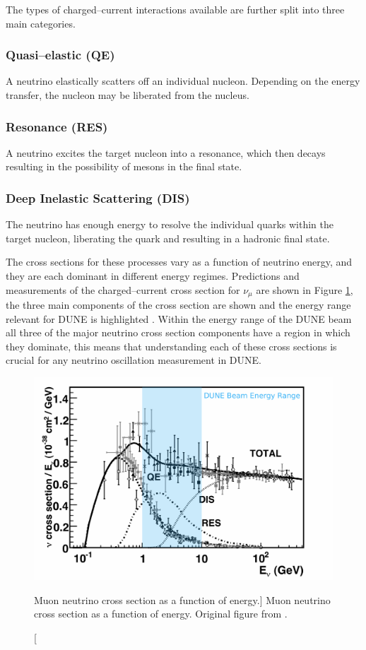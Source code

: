 The types of charged--current interactions available are further split into 
three main categories.

\subsubsection*{Quasi--elastic (QE)}
A neutrino elastically scatters off an individual nucleon. Depending on the
energy transfer, the nucleon may be liberated from the nucleus.
\subsubsection*{Resonance (RES)}
A neutrino excites the target nucleon into a resonance, which then decays
resulting in the possibility of mesons in the final state.
\subsubsection*{Deep Inelastic Scattering (DIS)}
The neutrino has enough energy to resolve the individual quarks within the
target nucleon, liberating the quark and resulting in a hadronic final state.

\bigskip

The cross sections for these processes vary as a function of neutrino energy,
and they are each dominant in different energy regimes. Predictions and 
measurements of the charged--current cross section for $\nu_\mu$ are shown in 
Figure \ref{fig:numu_xsec}, the three main components of the cross section are 
shown and the energy range relevant for DUNE is highlighted 
\cite{Formaggio:2013kya}. Within the energy range of the DUNE beam all three of 
the major neutrino cross section components have a region in which they 
dominate, this means that understanding each of these cross sections is crucial 
for any neutrino oscillation measurement in DUNE. 

\begin{figure}
	\centering
	\includegraphics[width=\textwidth]{figures/numu_xsec.pdf}
	\caption
	[Muon neutrino cross section as a function of energy.]
	{Muon neutrino cross section as a function of energy. Original figure from 
	\cite{Formaggio:2013kya}.}
	\label{fig:numu_xsec}
\end{figure}

